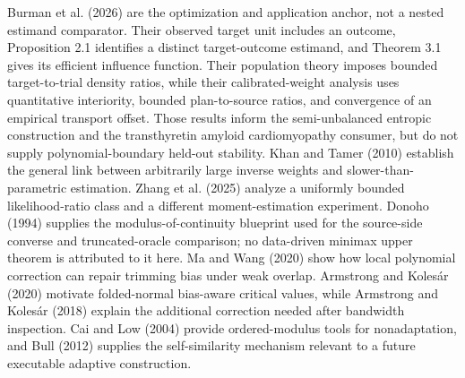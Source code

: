 Burman et al. (2026) are the optimization and application anchor, not a nested estimand comparator. Their observed target unit includes an outcome, Proposition 2.1 identifies a distinct target-outcome estimand, and Theorem 3.1 gives its efficient influence function. Their population theory imposes bounded target-to-trial density ratios, while their calibrated-weight analysis uses quantitative interiority, bounded plan-to-source ratios, and convergence of an empirical transport offset. Those results inform the semi-unbalanced entropic construction and the transthyretin amyloid cardiomyopathy consumer, but do not supply polynomial-boundary held-out stability. Khan and Tamer (2010) establish the general link between arbitrarily large inverse weights and slower-than-parametric estimation. Zhang et al. (2025) analyze a uniformly bounded likelihood-ratio class and a different moment-estimation experiment. Donoho (1994) supplies the modulus-of-continuity blueprint used for the source-side converse and truncated-oracle comparison; no data-driven minimax upper theorem is attributed to it here. Ma and Wang (2020) show how local polynomial correction can repair trimming bias under weak overlap. Armstrong and Kolesár (2020) motivate folded-normal bias-aware critical values, while Armstrong and Kolesár (2018) explain the additional correction needed after bandwidth inspection. Cai and Low (2004) provide ordered-modulus tools for nonadaptation, and Bull (2012) supplies the self-similarity mechanism relevant to a future executable adaptive construction.